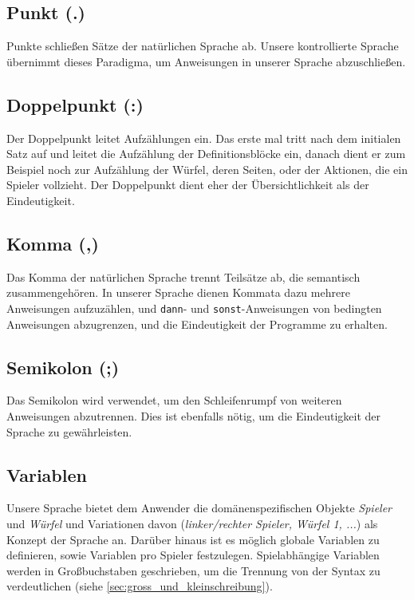 	\subsection{Punkt (.)}
	\label{sub:punkt}
		Punkte schließen Sätze der natürlichen Sprache ab. Unsere kontrollierte Sprache übernimmt dieses Paradigma, um Anweisungen in unserer Sprache abzuschließen.

	\subsection{Doppelpunkt (:)}
    \label{sub:doppelpunkt}
		Der Doppelpunkt leitet Aufzählungen ein. Das erste mal tritt nach dem initialen Satz auf und leitet die Aufzählung der Definitionsblöcke ein, danach dient er zum Beispiel noch zur Aufzählung der Würfel, deren Seiten, oder der Aktionen, die ein Spieler vollzieht. Der Doppelpunkt dient eher der Übersichtlichkeit als der Eindeutigkeit.

	\subsection{Komma (,)}
	\label{sub:komma}
		Das Komma der natürlichen Sprache trennt Teilsätze ab, die semantisch zusammengehören. In unserer Sprache dienen Kommata dazu mehrere Anweisungen aufzuzählen, und \texttt{dann}- und \texttt{sonst}-Anweisungen von bedingten Anweisungen abzugrenzen, und die Eindeutigkeit der Programme zu erhalten.

	\subsection{Semikolon (;)}
	\label{sub:semikolon}
		Das Semikolon wird verwendet, um den Schleifenrumpf von weiteren Anweisungen abzutrennen. Dies ist ebenfalls nötig, um die Eindeutigkeit der Sprache zu gewährleisten.

	\subsection{Variablen}
    \label{sub:variablen}
        Unsere Sprache bietet dem Anwender die domänenspezifischen Objekte \emph{Spieler} und \emph{Würfel} und Variationen davon (\emph{linker/rechter Spieler, Würfel 1, ...}) als Konzept der Sprache an. Darüber hinaus ist es möglich globale Variablen zu definieren, sowie Variablen pro Spieler festzulegen. Spielabhängige Variablen werden in Großbuchstaben geschrieben, um die Trennung von der Syntax zu verdeutlichen (siehe \ref{sec:gross_und_kleinschreibung}).


